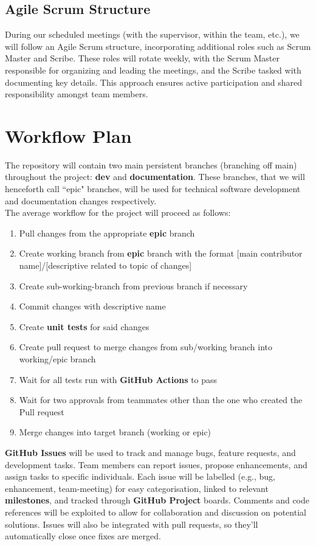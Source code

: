\documentclass{article}
\begin{document}
\subsection*{Agile Scrum Structure}
During our scheduled meetings (with the supervisor, within the team, etc.), we will follow an Agile Scrum structure, incorporating 
additional roles such as Scrum Master and Scribe. These roles will rotate weekly, with the Scrum Master responsible for organizing 
and leading the meetings, and the Scribe tasked with documenting key details. This approach ensures active participation and shared 
responsibility amongst team members.

\section{Workflow Plan}

\hspace{\parindent}The repository will contain two main persistent branches (branching off main) throughout the project:
\textbf{dev} and \textbf{documentation}. These branches, that we will henceforth call ``epic" branches, will be used for technical
software development and documentation changes respectively. \\

The average workflow for the project will proceed as follows:
\begin{enumerate}
  \item Pull changes from the appropriate \textbf{epic} branch
  \item Create working branch from \textbf{epic} branch with the format [main contributor name]/[descriptive related to topic of changes]
  \item Create sub-working-branch from previous branch if necessary
  \item Commit changes with descriptive name
  \item Create \textbf{unit tests} for said changes
  \item Create pull request to merge changes from sub/working branch into working/epic branch
  \item Wait for all tests run with \textbf{GitHub Actions} to pass
  \item Wait for two approvals from teammates other than the one who created the Pull request
  \item Merge changes into target branch (working or epic)
\end{enumerate}

\noindent
\hspace{\parindent}\textbf{GitHub Issues} will be used to track and manage bugs, feature requests, and development tasks. Team members can report issues, propose enhancements, and assign tasks to specific individuals. Each issue will be labelled (e.g., bug, enhancement, team-meeting) for easy categorisation, linked to relevant \textbf{milestones}, and tracked through \textbf{GitHub Project} boards. Comments and code references will be exploited to allow for collaboration and discussion on potential solutions. Issues will also be integrated with pull requests, so they’ll automatically close once fixes are merged. \\
\end{document}

